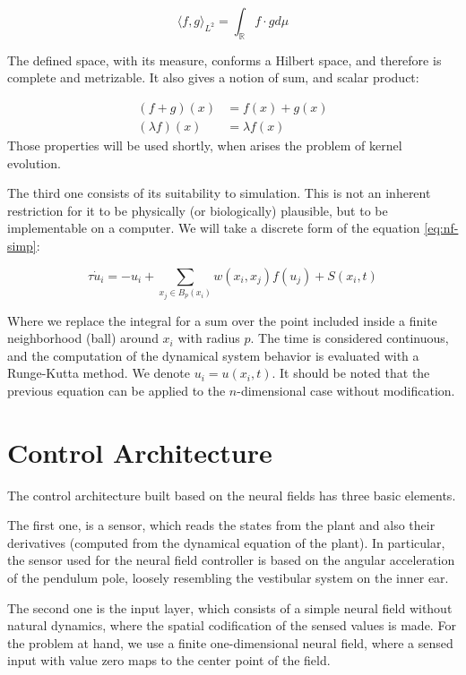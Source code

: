 \begin{equation}
  \label{eq:eq-l2}
  \langle f,g \rangle_{L^2} = \int_{\mathbb{R}}{f\cdot g d\mu}
\end{equation}

The defined space, with its measure, conforms a Hilbert space, and
therefore is complete and metrizable. It also gives a notion of sum,
and scalar product:

\begin{align}
  \label{eq:eq-leb-opers}
  (f+g)(x)&=f(x)+g(x) \\
  (\lambda f)(x)&=\lambda f(x)
\end{align}
Those properties will be used shortly, when arises the problem of
kernel evolution.

The third one consists of its suitability to simulation. This is not an
inherent restriction for it to be physically (or biologically)
plausible, but to be implementable on a computer. We will take a
discrete form of the equation \ref{eq:nf-simp}:

\begin{equation}
  \label{eq:nf-disc}
  \tau \dot{u}_i=-u_i+\sum_{x_j \in B_p(x_i)} {w\left(x_i,x_j\right)
    f\left( u_j \right)}+S(x_i,t)
\end{equation}

Where we replace the integral for a sum over the point included inside
a finite neighborhood (ball) around $x_i$ with radius $p$. The time is considered
continuous, and the computation of the dynamical system behavior is
evaluated with a Runge-Kutta method. We denote $u_i=u(x_i,t)$. It
should be noted that the previous equation can be applied to the
$n$-dimensional case without modification.

\section{Control Architecture}
The control architecture built based on the neural fields has three
basic elements.

The first one, is a sensor, which reads the states from the plant and
also their derivatives (computed from the dynamical equation of the
plant). In particular, the sensor used for the neural field controller
is based on the angular acceleration of the pendulum pole, loosely
resembling the vestibular system on the inner ear.

The second one is the input layer, which consists of a simple neural
field without natural dynamics, where the spatial codification of the
sensed values is made. For the problem at hand, we use a finite
one-dimensional neural field, where a sensed input with value zero
maps to the center point of the field.


